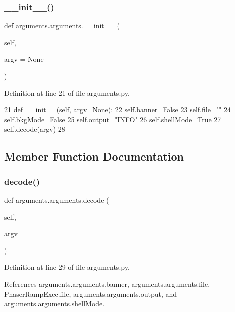 \subsubsection{\texorpdfstring{\+\_\+\+\_\+init\+\_\+\+\_\+()}{\_\_init\_\_()}}
{\footnotesize\ttfamily def arguments.\+arguments.\+\_\+\+\_\+init\+\_\+\+\_\+ (\begin{DoxyParamCaption}\item[{}]{self,  }\item[{}]{argv = {\ttfamily None} }\end{DoxyParamCaption})}



Definition at line 21 of file arguments.\+py.


\begin{DoxyCode}
21     \textcolor{keyword}{def }\hyperlink{classwrapper_1_1ModuleDictWrapper_a9a7a794150502f51df687831583e13b9}{\_\_init\_\_}(self, argv=None):
22         self.banner=\textcolor{keyword}{False}
23         self.file=\textcolor{stringliteral}{""}
24         self.bkgMode=\textcolor{keyword}{False}
25         self.output=\textcolor{stringliteral}{"INFO"}
26         self.shellMode=\textcolor{keyword}{True}
27         self.decode(argv)
28 
\end{DoxyCode}


\subsection{Member Function Documentation}
\mbox{\label{classarguments_1_1arguments_a05c504158f7fdfeb8824820da75d6f4e}} 
\subsubsection{\texorpdfstring{decode()}{decode()}}
{\footnotesize\ttfamily def arguments.\+arguments.\+decode (\begin{DoxyParamCaption}\item[{}]{self,  }\item[{}]{argv }\end{DoxyParamCaption})}



Definition at line 29 of file arguments.\+py.



References arguments.\+arguments.\+banner, arguments.\+arguments.\+file, Phaser\+Ramp\+Exec.\+file, arguments.\+arguments.\+output, and arguments.\+arguments.\+shell\+Mode.


